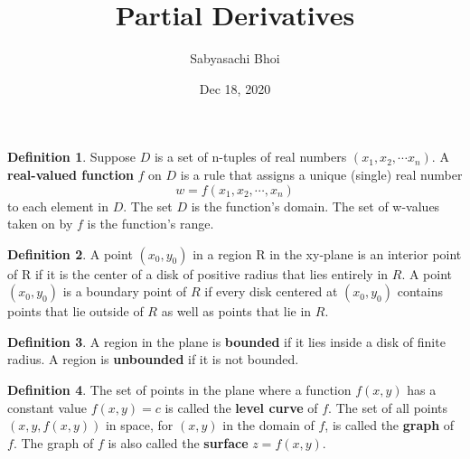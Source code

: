 \documentclass[12pt]{article}
\theoremstyle{definition}
\theoremstyle{definition}
\newtheorem*{defn}{Definition}
\begin{document}
\title{Partial Derivatives}
\author{Sabyasachi Bhoi}
\date{Dec 18, 2020}
\maketitle

\begin{defn}
	Suppose $D$ is a set of n-tuples of real numbers $(x_1, x_2, \cdots x_n)$. A \textbf{real-valued function} $f$ on $D$ is a rule that assigns a unique (single) real number
	\begin{equation*}
		w = f(x_1, x_2, \cdots, x_n)
	\end{equation*}
to each element in $D$. The set $D$ is the function's domain. The set of w-values taken on by $f$ is the function's range. 
\end{defn}

\begin{defn}
	A point $(x_0, y_0)$ in a region R in the xy-plane is an interior point of R if it is the center of a disk of positive radius that lies entirely in $R$. A point $(x_0, y_0)$ is a boundary point of $R$ if every disk centered at $(x_0, y_0)$ contains points that lie outside of $R$ as well as points that lie in $R$.
\end{defn}

\begin{defn}
	A region in the plane is \textbf{bounded} if it lies inside a disk of finite radius. A region is \textbf{unbounded} if it is not bounded. 
\end{defn}

\begin{defn}
	The set of points in the plane where a function $f(x, y)$ has a constant value $f(x, y) = c$ is called the \textbf{level curve} of $f$. The set of all points $(x, y, f(x, y))$ in space, for $(x, y)$ in the domain of $f$, is called the \textbf{graph} of $f$. The graph of $f$ is also called the \textbf{surface} $z = f(x, y)$.  
\end{defn}
\end{document}

